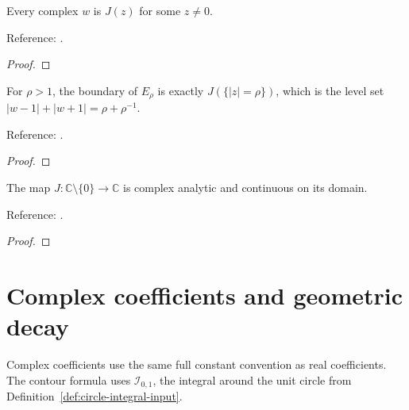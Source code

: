 \begin{supporting}
\begin{theorem}
\label{thm:joukowski-surjective}
\leanok
Every complex $w$ is $J(z)$ for some $z\ne0$.

Reference: \cite[Chapter 8]{atap}.
\end{theorem}
\begin{proof}
\leanok
\end{proof}

\begin{theorem}
\label{thm:ellipse-boundary}
\leanok
For $\rho>1$, the boundary of $E_\rho$ is exactly $J(\{|z|=\rho\})$,
which is the level set $|w-1|+|w+1|=\rho+\rho^{-1}$.

Reference: \cite[Chapter 8]{atap}.
\end{theorem}
\begin{proof}
\leanok
\end{proof}

\begin{theorem}
\label{thm:joukowski-analytic}
\leanok
The map $J:\mathbb C\setminus\{0\}\to\mathbb C$ is complex analytic
and continuous on its domain.

Reference: \cite[Chapter 8]{atap}.
\end{theorem}
\begin{proof}
\leanok
\end{proof}

\end{supporting}

\section{Complex coefficients and geometric decay}\label{sec:textbook-analytic-decay}

Complex coefficients use the same full constant convention as real coefficients. The contour formula uses $\mathcal I_{0,1}$, the integral around the unit circle from Definition~\ref{def:circle-integral-input}.

